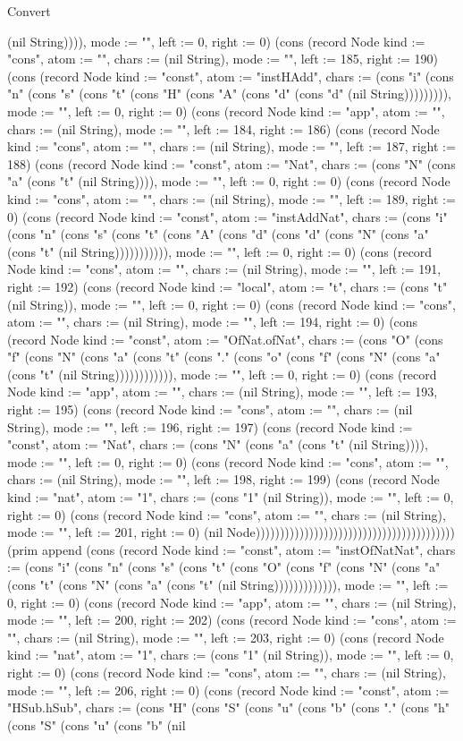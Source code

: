 \begin{lexlean}{Convert}
\begin{semanticmodule}
{(nil String)))), mode := "", left := 0, right := 0}) (cons (record Node {kind := "cons", atom := "", chars := (nil String), mode := "", left := 185, right := 190}) (cons (record Node {kind := "const", atom := "instHAdd", chars := (cons "i" (cons "n" (cons "s" (cons "t" (cons "H" (cons "A" (cons "d" (cons "d" (nil String))))))))), mode := "", left := 0, right := 0}) (cons (record Node {kind := "app", atom := "", chars := (nil String), mode := "", left := 184, right := 186}) (cons (record Node {kind := "cons", atom := "", chars := (nil String), mode := "", left := 187, right := 188}) (cons (record Node {kind := "const", atom := "Nat", chars := (cons "N" (cons "a" (cons "t" (nil String)))), mode := "", left := 0, right := 0}) (cons (record Node {kind := "cons", atom := "", chars := (nil String), mode := "", left := 189, right := 0}) (cons (record Node {kind := "const", atom := "instAddNat", chars := (cons "i" (cons "n" (cons "s" (cons "t" (cons "A" (cons "d" (cons "d" (cons "N" (cons "a" (cons "t" (nil String))))))))))), mode := "", left := 0, right := 0}) (cons (record Node {kind := "cons", atom := "", chars := (nil String), mode := "", left := 191, right := 192}) (cons (record Node {kind := "local", atom := "t", chars := (cons "t" (nil String)), mode := "", left := 0, right := 0}) (cons (record Node {kind := "cons", atom := "", chars := (nil String), mode := "", left := 194, right := 0}) (cons (record Node {kind := "const", atom := "OfNat.ofNat", chars := (cons "O" (cons "f" (cons "N" (cons "a" (cons "t" (cons "." (cons "o" (cons "f" (cons "N" (cons "a" (cons "t" (nil String)))))))))))), mode := "", left := 0, right := 0}) (cons (record Node {kind := "app", atom := "", chars := (nil String), mode := "", left := 193, right := 195}) (cons (record Node {kind := "cons", atom := "", chars := (nil String), mode := "", left := 196, right := 197}) (cons (record Node {kind := "const", atom := "Nat", chars := (cons "N" (cons "a" (cons "t" (nil String)))), mode := "", left := 0, right := 0}) (cons (record Node {kind := "cons", atom := "", chars := (nil String), mode := "", left := 198, right := 199}) (cons (record Node {kind := "nat", atom := "1", chars := (cons "1" (nil String)), mode := "", left := 0, right := 0}) (cons (record Node {kind := "cons", atom := "", chars := (nil String), mode := "", left := 201, right := 0}) (nil Node))))))))))))))))))))))))))))))))))))))))) (prim append (cons (record Node {kind := "const", atom := "instOfNatNat", chars := (cons "i" (cons "n" (cons "s" (cons "t" (cons "O" (cons "f" (cons "N" (cons "a" (cons "t" (cons "N" (cons "a" (cons "t" (nil String))))))))))))), mode := "", left := 0, right := 0}) (cons (record Node {kind := "app", atom := "", chars := (nil String), mode := "", left := 200, right := 202}) (cons (record Node {kind := "cons", atom := "", chars := (nil String), mode := "", left := 203, right := 0}) (cons (record Node {kind := "nat", atom := "1", chars := (cons "1" (nil String)), mode := "", left := 0, right := 0}) (cons (record Node {kind := "cons", atom := "", chars := (nil String), mode := "", left := 206, right := 0}) (cons (record Node {kind := "const", atom := "HSub.hSub", chars := (cons "H" (cons "S" (cons "u" (cons "b" (cons "." (cons "h" (cons "S" (cons "u" (cons "b" (nil }
\end{semanticmodule}
\end{lexlean}
